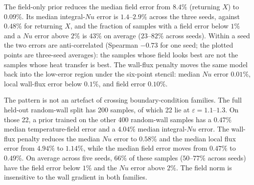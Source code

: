 \documentclass[preprint,11pt,a4paper,times]{elsarticle}
\begin{document}
The field-only prior reduces the median field error from $8.4\%$ (returning $X$) to $0.09\%$.
Its median integral-$Nu$ error is $1.4$--$2.9\%$ across the three seeds,
against $0.48\%$ for returning $X$, and the fraction of samples with a field
error below $1\%$ and a $Nu$ error above $2\%$ is $43\%$ on average ($23$--$82\%$ across
seeds). Within a seed the two errors are anti-correlated
(Spearman $-0.73$ for one seed; the plotted points are three-seed averages): the samples whose field looks
best are not the samples whose heat transfer is best. The wall-flux penalty moves the same
model back into the low-error region under the six-point stencil: median $Nu$ error $0.01\%$,
local wall-flux error below $0.1\%$, and field error $0.10\%$.

The pattern is not an artefact of crossing boundary-condition families. The full held-out
random-wall split has 200 samples, of which 22 lie at $\varepsilon=1.1$--$1.3$. On those 22, a
prior trained on the other 400 random-wall samples has a $0.47\%$ median temperature-field error
and a $4.04\%$ median integral-$Nu$ error. The wall-flux penalty reduces the median $Nu$ error to
$0.58\%$ and the median local flux error from $4.94\%$ to $1.14\%$, while the median field error
moves from $0.47\%$ to $0.49\%$. On average across five seeds, $66\%$ of these samples ($50$--$77\%$ across seeds)
have the field error below $1\%$ and the $Nu$ error above $2\%$. The field norm is insensitive
to the wall gradient in both families.

\begin{table}[htbp]
\centering
\caption{Field error versus wall heat transfer on 200 held-out classical-cavity samples at
$\varepsilon=1.2$. $T$ is the per-sample median relative $L_2$ error; the $Nu$
columns are the hot wall, cold wall, and both walls normalised by the true total; the last two
columns are the mean absolute wall-flux profile error and the fraction of
samples with $T<1\%$ and $Nu>2\%$. All errors are relative to the $64^2$ target. Values are
means across three seeds; for the field-only
prior the both-wall error ranges from $1.4$ to $2.9\%$ and the fraction from $23$ to $82\%$.
The wall-flux row uses the penalty of Eq.~\eqref{eq:fluxloss}.}
\label{tab:headline}
\small
\setlength{\tabcolsep}{3.5pt}
\end{table}
\end{document}
